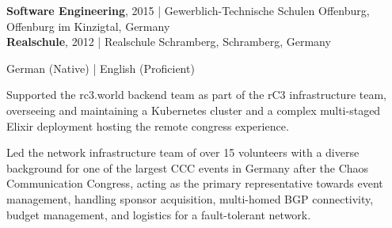 
\begin{center}
  \textbf{Software Engineering}, 2015 | Gewerblich-Technische Schulen Offenburg, Offenburg im Kinzigtal, Germany\\
  \textbf{Realschule}, 2012 | Realschule Schramberg, Schramberg, Germany
\end{center}


\begin{center}
  German (Native) | English (Proficient)
\end{center}



Supported the rc3.world backend team as part of the rC3 infrastructure team, overseeing and maintaining a Kubernetes cluster and a complex multi-staged Elixir deployment hosting the remote congress experience.

\begin{itemize}
\end{itemize}


Led the network infrastructure team of over 15 volunteers with a diverse background for one of the largest CCC events in Germany after the Chaos Communication Congress, acting as the primary representative towards event management, handling sponsor acquisition, multi-homed BGP connectivity, budget management, and logistics for a fault-tolerant network.


